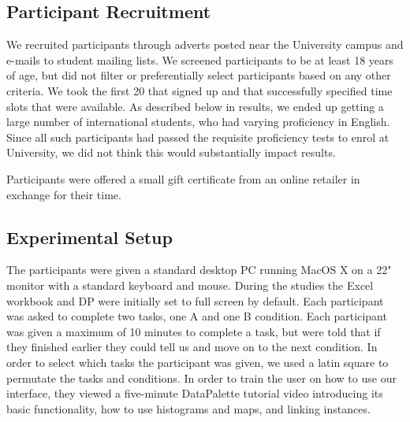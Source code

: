 \documentclass{sigchi}
\begin{document}
\subsection{Participant Recruitment}
We recruited participants through adverts posted near the University campus and e-mails to student mailing lists.  We screened participants to be at least 18 years of age, but did not filter or preferentially select participants based on any other criteria.  We took the first 20 that signed up and that successfully specified time slots that were available.   As described below in results, we ended up getting a large number of international students, who had varying proficiency in English.  Since all such participants had passed the requisite proficiency tests to enrol at University, we did not think this would substantially impact results.

Participants were offered a small gift certificate from an online retailer in exchange for their time. 

\subsection{Experimental Setup}
The participants were given a standard desktop PC running MacOS X on a 22" monitor with a standard keyboard and mouse.  During the studies the Excel workbook and DP were initially set to full screen by default.  Each participant was asked to complete two tasks, one A and one B condition.  Each participant was given a maximum of 10 minutes to complete a task, but were told that if they finished earlier they could tell us and move on to the next condition.  In order to select which tasks the participant was given, we used a latin square to permutate the tasks and conditions.  In order to train the user on how to use our interface, they viewed a five-minute DataPalette tutorial video introducing its basic functionality, how to use histograms and maps, and linking instances.


\end{document}
